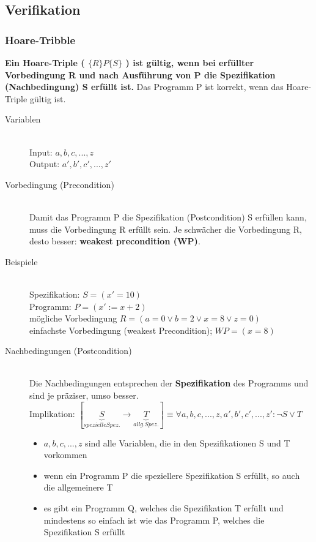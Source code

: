 \documentclass[a4paper,10pt]{article}
\newcommand{\Bold}[1]{\textbf{#1}} %
\newcommand{\ra}{\rightarrow}
\begin{document}
\subsection{Verifikation}
\subsubsection{Hoare-Tribble}
\Bold {Ein Hoare-Triple ( $\{ R \} P \{ S \}$ ) ist g\"ultig, wenn bei erf\"ullter Vorbedingung R und nach Ausf\"uhrung von P die Spezifikation (Nachbedingung) S erf\"ullt ist.} Das Programm P ist korrekt, wenn das Hoare-Triple g\"ultig ist.
\begin{description}
	\item[Variablen] \hfill \\
		Input: $a, b, c, ..., z$ \\
		Output: $a', b', c', ..., z'$
	\item[Vorbedingung (Precondition)] \hfill \\
		Damit das Programm P die Spezifikation (Postcondition) S erf\"ullen kann, muss die Vorbedingung R erf\"ullt sein. Je schw\"acher die Vorbedingung R, desto besser: \Bold {weakest precondition (WP)}.
	\item[Beispiele] \hfill \\
		Spezifikation: $S = (x' = 10)$ \\
		Programm: $P = (x' := x + 2)$ \\
		m\"ogliche Vorbedingung $R = (a = 0 \vee b = 2 \vee x = 8 \vee z = 0)$ \\
		einfachste Vorbedingung (weakest Precondition);  $WP = (x = 8)$
\pagebreak
	\item[Nachbedingungen (Postcondition)] \hfill \\
		Die Nachbedingungen entsprechen der \Bold {Spezifikation} des Programms und sind je pr\"aziser, umso besser. \\
		Implikation: $[\underbrace{S}_{spezielle Spez.} \ra \underbrace{T}_{allg. Spez.}] \equiv \forall a, b, c, ..., z, a', b', c', ..., z': \neg S \vee T$
		\begin{itemize}
			\item $a, b, c, ..., z$ sind alle Variablen, die in den Spezifikationen S und T vorkommen
			\item wenn ein Programm P die speziellere Spezifikation S erf\"ullt, so auch die allgemeinere T
			\item es gibt ein Programm Q, welches die Spezifikation T erf\"ullt und mindestens so einfach ist wie das Programm P, welches die Spezifikation S erf\"ullt

\end{itemize}
\end{description}
\end{document}
